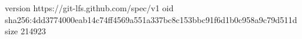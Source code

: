 version https://git-lfs.github.com/spec/v1
oid sha256:4dd3774000eab14c74ff4569a551a337bc8c153bbc91f6d1b0c958a9c79d511d
size 214923
